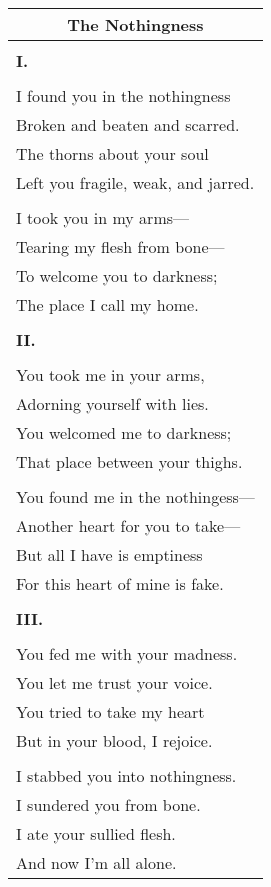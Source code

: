 \documentclass{article}
\begin{document}
\newcommand{\h}{\hspace*{2ex}}
\newcommand{\hh}{\hspace*{4ex}}
\newcommand{\hhh}{\hspace*{6ex}}

\begin{center}
\begin{tabular}{l}
\multicolumn{1}{c}{\textbf{The Nothingness}} \\\hline
\\
\textbf{I.} \\
\\
I found you in the nothingness \\
\h{}Broken and beaten and scarred. \\
\hh{}The thorns about your soul \\
\hhh{}Left you fragile, weak, and jarred. \\
\\
I took you in my arms--- \\
\h{}Tearing my flesh from bone--- \\
\hh{}To welcome you to darkness; \\
\hhh{}The place I call my home. \\
\\
\textbf{II.} \\
\\
You took me in your arms, \\
\h{}Adorning yourself with lies. \\
\hh{}You welcomed me to darkness; \\
\hhh{}That place between your thighs. \\
\\
You found me in the nothingess--- \\
\h{}Another heart for you to take--- \\
\hh{}But all I have is emptiness \\
\hhh{}For this heart of mine is fake. \\
\\
\textbf{III.} \\
\\
You fed me with your madness. \\
\h{}You let me trust your voice. \\
\hh{}You tried to take my heart \\
\hhh{}But in your blood, I rejoice. \\
\\
I stabbed you into nothingness. \\
\h{}I sundered you from bone. \\
\hh{}I ate your sullied flesh. \\
\hhh{}And now I'm all alone. \\
\end{tabular}
\end{center}
\end{document}
